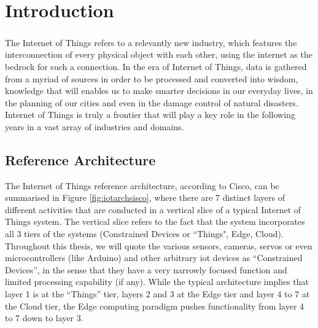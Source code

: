 
\chapter{Introduction}

\paragraph{}
The Internet of Things refers to a relevantly new industry, which features the interconnection of every physical object with each other, using the internet as the bedrock for such a connection. In the era of Internet of Things, data is gathered from a myriad of sources in order to be processed and converted into wisdom, knowledge that will enables us to make smarter decisions in our everyday lives, in the planning of our cities and even in the damage control of natural disasters. Internet of Things is truly a frontier that will play a key role in the following years in a vast array of industries and domains.

\section{Reference Architecture}
The Internet of Things reference architecture, according to Cisco, can be summarised in Figure \ref{fig:iotarchsisco}, where there are 7 distinct layers of different activities that are conducted in a vertical slice of a typical Internet of Things system. The vertical slice refers to the fact that the system incorporates all 3 tiers of the systems (Constrained Devices or “Things", Edge, Cloud).  Throughout this thesis,  we will quote the various sensors, cameras, servos or even microcontrollers (like Arduino)  and other arbitrary \acrfull{iot} devices as “Constrained Devices”, in the sense that they have a very narrowly focused function and limited processing capability (if any).  While the typical architecture implies that layer 1 is at the “Things” tier, layers 2 and 3 at the Edge tier and layer 4 to 7 at the Cloud tier, the Edge computing paradigm pushes functionality from layer 4 to 7 down to layer 3.

